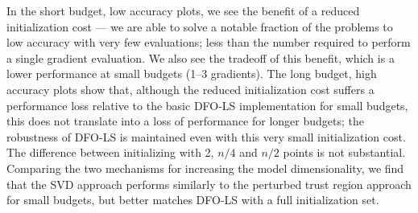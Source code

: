 In the short budget, low accuracy plots, we see the benefit of a reduced initialization cost --- we are able to solve a notable fraction of the problems to low accuracy with very few evaluations; less than the number required to perform a single gradient evaluation.
We also see the tradeoff of this benefit, which is a lower performance at small budgets (1--3 gradients).
The long budget, high accuracy plots show that, although the reduced initialization cost suffers a performance loss relative to the basic DFO-LS implementation for small budgets, this does not translate into a loss of performance for longer budgets; the robustness of DFO-LS is maintained even with this very small initialization cost.
The difference between initializing with 2, $n/4$ and $n/2$ points is not substantial.
Comparing the two mechanisms for increasing the model dimensionality, we find that the SVD approach performs similarly to the perturbed trust region approach for small budgets, but better matches DFO-LS with a full initialization set.

